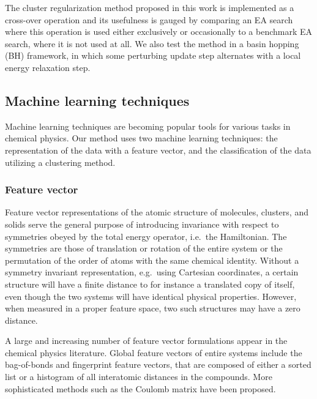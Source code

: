 \documentclass[aip,amsmath,amssymb,reprint]{revtex4-1}
\begin{document}
The cluster regularization method proposed in this work is implemented
as a cross-over operation and its usefulness is gauged by comparing an
EA search where this operation is used either exclusively or
occasionally to a benchmark EA search, where it is not used at all. We
also test the method in a basin hopping (BH) framework,\cite{wales1997} in which some
perturbing update step alternates with a local energy relaxation step.

\subsection{Machine learning techniques}
Machine learning techniques are becoming popular tools for various tasks in chemical physics.\cite{Rupp2012,Bartok2013,Hansen2013,Li2015,Botu2015,Khorshidi2016,Alexandrova2016,Schutt2017,Parkhill2017,Patra2017} Our method uses two machine learning techniques:
the representation of the data with a feature vector, and the
classification of the data utilizing a clustering method.

\subsubsection{Feature vector}
Feature vector representations of the atomic structure of molecules,
clusters, and solids serve the general purpose of introducing
invariance with respect to symmetries obeyed by the total energy
operator, i.e.\ the Hamiltonian.\cite{Bartok2013} The symmetries are those of translation
or rotation of the entire system or the permutation of the order of
atoms with the same chemical identity. Without a symmetry invariant
representation, e.g.\ using Cartesian coordinates, a certain structure
will have a finite distance to for instance a translated copy of
itself, even though the two systems will have identical physical
properties. However, when measured in a proper feature space, two such
structures may have a zero distance.

A large and increasing number of feature vector formulations appear in
the chemical physics literature. Global feature vectors of entire
systems include the bag-of-bonds\cite{bag_of_bonds} and fingerprint\cite{finger_print,finger_print_application} feature
vectors, that are composed of either a sorted list or a histogram of
all interatomic distances in the compounds. More
sophisticated methods such as the Coulomb matrix\cite{coulomb_matrix1,coulomb_matrix2} have been
proposed.
\end{document}
